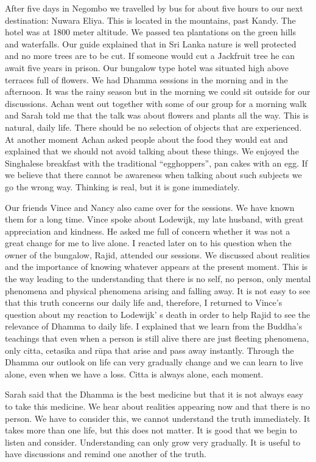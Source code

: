 After five days in Negombo we travelled by bus for about five hours to our next destination: Nuwara Eliya. This is located in the mountains, past Kandy. The hotel was 
at 1800 meter altitude. We passed tea plantations on the green hills and waterfalls. 
Our guide explained that in Sri Lanka nature is well protected and no more trees are 
to be cut. If someone would cut a Jackfruit tree he can await five years in prison. Our 
bungalow type hotel was situated high above terraces full of flowers. We had 
Dhamma sessions in the morning and in the afternoon. It was the rainy season but in 
the morning we could sit outside for our discussions.  Achan went out together with 
some of our group for a morning walk and Sarah told me that the talk was about 
flowers and plants all the way. This is natural, daily life. There should be no selection 
of objects that are experienced. At another moment  Achan asked people about the 
food they would eat and explained that we should not avoid talking about these 
things. We enjoyed the Singhalese breakfast with the traditional ``egghoppers'', pan 
cakes with an egg. If we believe that there cannot be awareness when talking about 
such subjects we go the wrong way. Thinking is real, but it is gone immediately. 

Our friends Vince and Nancy also came over for the sessions. We have known them 
for a long time. Vince spoke about Lodewijk, my late husband, with great appreciation and kindness. He asked me full of concern whether it was not a great change for 
me to live alone. I reacted later on to his question when the owner of the bungalow, 
Rajid, attended our sessions. We discussed about realities and the importance of 
knowing whatever appears at the present moment. This is the way leading to the understanding that there is no self, no person, only mental phenomena and physical phenomena arising and falling away. It is not easy to see that this truth concerns our daily life and, therefore, I returned to Vince’s question about my reaction to Lodewijk’ s death in order to help Rajid to see the relevance of Dhamma to daily life. I explained that we learn from the Buddha’s teachings that even when a person is still 
alive there are just fleeting phenomena, only citta, cetasika and rūpa that arise and 
pass away instantly. Through the Dhamma our outlook on life can very gradually 
change and we can learn to live alone, even when we have a loss. Citta is always 
alone, each moment. 

Sarah said that the Dhamma is the best medicine but that it is not always easy to take 
this medicine. We hear about realities appearing now and that there is no person. We 
have to consider this, we cannot understand the truth immediately. It takes more than 
one life, but this does not matter. It is good that we begin to listen and consider. Understanding can only grow very gradually. It is useful to have discussions and remind 
one another of the truth. 

